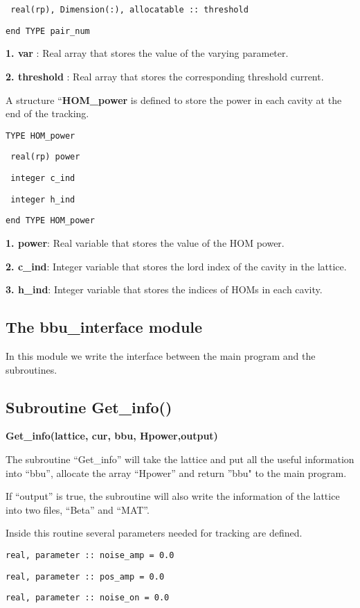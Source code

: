 \documentclass[12pt]{article}
\begin{document}
\texttt{  real(rp), Dimension(:), allocatable ::  threshold}

\texttt{end TYPE pair\_num}

{\bf 1. var} : Real array that stores the value of the varying parameter.

{\bf 2. threshold} : Real array that stores the corresponding threshold current.

A structure ``{\bf HOM\_power} is defined to store the power in each cavity at the end of the tracking.

\texttt{TYPE HOM\_power}

\texttt{  real(rp)  power}

\texttt{  integer   c\_ind}

\texttt{  integer   h\_ind}

\texttt{end TYPE HOM\_power}

{\bf 1. power}: Real variable that stores the value of the HOM power.

{\bf 2. c\_ind}: Integer variable that stores the lord index of the cavity in the lattice.

{\bf 3. h\_ind}: Integer variable that stores the indices of HOMs in each cavity.

\subsection{The bbu\_interface module}
In this module we write the interface between the main program and the subroutines.

\subsection{Subroutine Get\_info()}

{\bf Get\_info(lattice, cur, bbu,  Hpower,output)}

The subroutine ``Get\_info'' will take the lattice and put all the useful information into ``bbu'', allocate the array  ``Hpower'' and return ''bbu"  to the main program.

If ``output'' is true, the subroutine will also write the information of the lattice into two files, ``Beta'' and ``MAT''.

Inside this routine several parameters needed for tracking are defined. 


\texttt{real, parameter :: noise\_amp = 0.0}

\texttt{real, parameter :: pos\_amp = 0.0}

\texttt{real, parameter :: noise\_on = 0.0}
\end{document}
